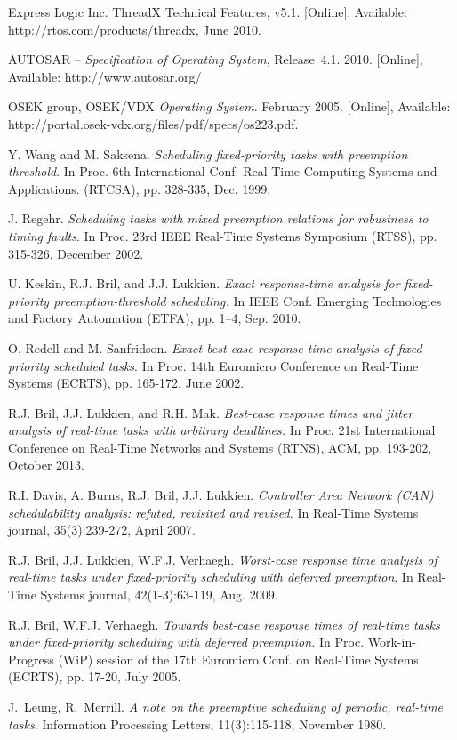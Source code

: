 \documentclass[conference,compsoc]{IEEEtran}
\begin{document}
\begin{thebibliography}{1}

Express Logic Inc. ThreadX Technical Features, v5.1. [Online].
Available: http://rtos.com/products/threadx, June 2010.

{AUTOSAR} -- \textit{Specification of Operating System}, {Release}~4.1.
2010.
[Online], Available: http://www.autosar.org/


OSEK group,
{OSEK/VDX} \textit{Operating System}.
February 2005.
[Online], Available: http://portal.osek-vdx.org/files/pdf/specs/os223.pdf.

Y. Wang and M. Saksena.
\textit{Scheduling fixed-priority tasks with preemption threshold}.
In Proc. 6th International Conf. Real-Time Computing Systems and Applications. (RTCSA), pp. 328-335, Dec. 1999.

J. Regehr.
\textit{Scheduling tasks with mixed preemption relations for robustness to timing faults}.
In Proc. 23rd IEEE Real-Time Systems Symposium (RTSS),
pp. 315-326,
December 2002.

U. Keskin, R.J. Bril, and J.J. Lukkien.
\textit{Exact response-time analysis for fixed-priority preemption-threshold scheduling.} 
In IEEE Conf. Emerging Technologies and Factory Automation (ETFA), pp. 1–4, Sep. 2010.

O. Redell and M. Sanfridson.
\textit{Exact best-case response time analysis of fixed priority scheduled tasks}.
In Proc. 14th Euromicro Conference on Real-Time Systems (ECRTS),
pp. 165-172, June 2002.

R.J. Bril, J.J. Lukkien, and R.H. Mak.
\textit{Best-case response times and jitter analysis of real-time tasks with arbitrary deadlines.}
In Proc. 21st International Conference on Real-Time Networks and Systems (RTNS), ACM, pp. 193-202, October 2013.

R.I. Davis, A. Burns, R.J. Bril, J.J. Lukkien.
\textit{Controller Area Network (CAN) schedulability analysis: refuted, revisited and revised.}
In Real-Time Systems journal, 
35(3):239-272, April 2007.

R.J. Bril, J.J. Lukkien, W.F.J. Verhaegh.
\textit{Worst-case response time analysis of real-time tasks under fixed-priority scheduling with deferred preemption}.
In Real-Time Systems journal, 42(1-3):63-119, Aug. 2009.

R.J. Bril, W.F.J. Verhaegh.
\textit{Towards best-case response times of real-time tasks under fixed-priority scheduling with deferred preemption.}
In Proc. Work-in-Progress (WiP) session of the 17th Euromicro Conf. on Real-Time Systems (ECRTS), pp. 17-20, July 2005.

J.~Leung, R.~Merrill. \textit{A note on the preemptive scheduling
	of periodic, real-time tasks}. 
Information Processing Letters,
11(3):115-118, November 1980.

\end{thebibliography}




\end{document}
